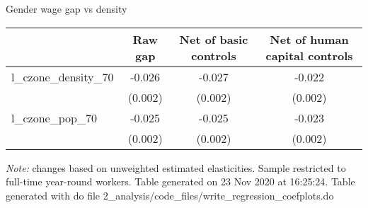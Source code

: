 \begin{center}
\begin{threeparttable}[!h]
\caption{Gender wage gap vs density}
\label{table:overall_change}
\begin{tabular}{lccc}
\toprule
\toprule
\textbf{}&\multicolumn{1}{c}{\textbf{Raw gap}}&\multicolumn{1}{c}{\textbf{Net of basic controls}}&\multicolumn{1}{c}{\textbf{Net of human capital controls}} \\
\midrule
l\_czone\_density\_70  &      -0.026\sym{***}&      -0.027\sym{***}&      -0.022\sym{***}\\
                    &     (0.002)         &     (0.002)         &     (0.002)         \\
l\_czone\_pop\_70      &      -0.025\sym{***}&      -0.025\sym{***}&      -0.023\sym{***}\\
                    &     (0.002)         &     (0.002)         &     (0.002)         \\
\bottomrule
\bottomrule
\end{tabular}
\begin{tablenotes}
\item \footnotesize \textit{Note:} changes based on unweighted estimated elasticities. Sample restricted to full-time year-round workers. Table generated on 23 Nov 2020 at 16:25:24. Table generated with do file 2\_analysis/code\_files/write\_regression\_coefplots.do
\end{tablenotes}
\end{threeparttable}
\end{center}
